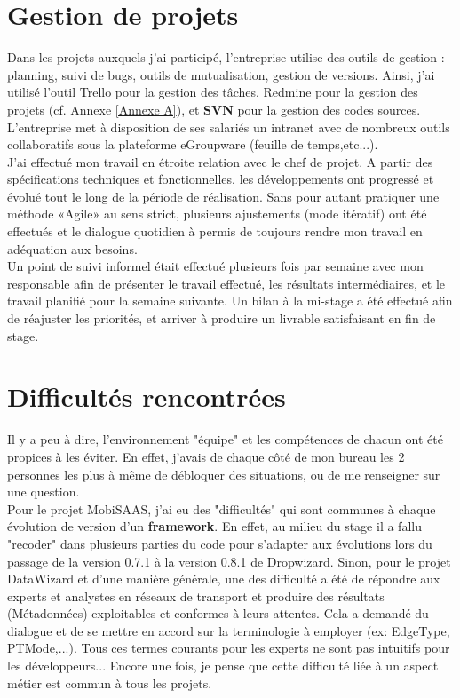 \section{Gestion de projets}

Dans les projets auxquels j'ai participé, l'entreprise utilise des outils de gestion : planning, suivi de bugs, outils de mutualisation, gestion de versions. Ainsi, j'ai utilisé l'outil Trello pour la gestion des tâches, Redmine pour la gestion des projets (cf. Annexe \ref{Annexe A}), et \textbf{SVN} pour la gestion des codes sources. L'entreprise met à disposition de ses salariés un intranet avec de nombreux outils collaboratifs sous la plateforme eGroupware (feuille de temps,etc...).\\

J'ai effectué mon travail en étroite relation avec le chef de projet. A partir des spécifications techniques et fonctionnelles, les développements ont progressé et évolué tout le long de la période de réalisation. Sans pour autant pratiquer une méthode «Agile» au sens strict, plusieurs ajustements (mode itératif) ont été effectués et le dialogue quotidien à permis de toujours rendre mon travail en adéquation aux besoins. \\

Un point de suivi informel était effectué plusieurs fois par semaine avec mon responsable afin de présenter le travail effectué, les résultats intermédiaires, et le travail planifié pour la semaine suivante. Un bilan à la mi-stage a été effectué afin de réajuster les priorités, et arriver à produire un livrable satisfaisant en fin de stage. \\


\section{Difficultés rencontrées}

Il y a peu à dire, l'environnement "équipe" et les compétences de chacun ont été propices à les éviter. En effet, j'avais de chaque côté de mon bureau les 2 personnes les plus à même de débloquer des situations, ou de me renseigner sur une question. \\

Pour le projet MobiSAAS, j'ai eu des "difficultés" qui sont communes à chaque évolution de version d'un \textbf{framework}. En effet, au milieu du stage il a fallu "recoder" dans plusieurs parties du code pour s'adapter aux évolutions lors du passage de la version 0.7.1 à la version 0.8.1 de Dropwizard.
Sinon, pour le projet DataWizard et d'une manière générale, une des difficulté a été de répondre aux experts et analystes en réseaux de transport et produire des résultats (Métadonnées) exploitables et conformes à leurs attentes. Cela a demandé du dialogue et de se mettre en accord sur la terminologie à employer (ex: EdgeType, PTMode,...). Tous ces termes courants pour les experts ne sont pas intuitifs pour les développeurs... Encore une fois, je pense que cette \og difficulté \fg liée à un aspect métier est commun à tous les projets.\\
